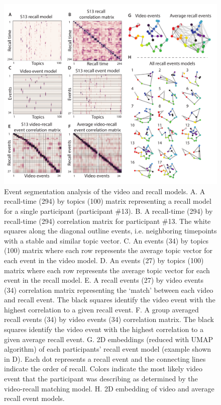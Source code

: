 \documentclass{article}
\begin{document}
{\begin{figure}[t!]
\centering
\includegraphics[width=.75\textwidth]{figs/2_eventseg.pdf}
\caption{\label{fig:eventseg} Event segmentation analysis of the video and recall models. A. A recall-time (294) by topics (100) matrix representing a recall model for a single participant (participant \#13).  B. A recall-time (294) by recall-time (294) correlation matrix for participant \#13. The white squares along the diagonal outline events, i.e. neighboring timepoints with a stable and similar topic vector. C. An events (34) by topics (100) matrix where each row represents the average topic vector for each event in the video model.  D. An events (27) by topics (100) matrix where each row represents the average topic vector for each event in the recall model. E. A recall events (27) by video events (34) correlation matrix representing the `match' between each video and recall event. The black squares identify the video event with the highest correlation to a given recall event. F. A group averaged recall events (34) by video events (34) correlation matrix.  The black squares identify the video event with the highest correlation to a given average recall event. G. 2D embeddings (reduced with UMAP algorithm) of each participants' recall event model (example shown in D). Each dot represents a recall event and the connecting lines indicate the order of recall. Colors indicate the most likely video event that the participant was describing as determined by the video-recall matching model.  H. 2D embedding of video and average recall event models.}
\end{figure}

}
\end{document}
